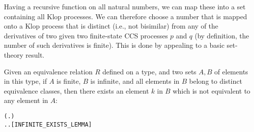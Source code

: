 Having
 a recursive function  on all natural numbers,
  we can map these into a set containing  all Klop processes. 
We can therefore 
choose a number that is mapped onto a Klop process
that is distinct (i.e., not bisimilar)  from 
any  of the derivatives of two  given 
two finite-state CCS processes $p$ and $q$
(by definition, the number of such derivatives is finite).
This is done by 
appealing to a basic set-theory result.

\begin{lemma}
Given an equivalence relation $R$ defined on a type, and two sets $A, B$
of elements in this type, 
if $A$ is finite, $B$ is infinite, and all elements
in $B$ belong to distinct equivalence classes, then there exists an element $k$ in $B$
which is not equivalent to any element in $A$:
\begin{alltt}
\HOLTokenTurnstile{}   \HOLSymConst{\HOLTokenImp{}}
     \HOLSymConst{\HOLTokenConj{}}   \HOLSymConst{\HOLTokenConj{}}
   (\HOLSymConst{\HOLTokenForall{}} .  \HOLSymConst{\HOLTokenIn{}}  \HOLSymConst{\HOLTokenConj{}}  \HOLSymConst{\HOLTokenIn{}}  \HOLSymConst{\HOLTokenConj{}}  \HOLSymConst{\HOLTokenNotEqual{}}  \HOLSymConst{\HOLTokenImp{}} \HOLSymConst{\HOLTokenNeg{}}  ) \HOLSymConst{\HOLTokenImp{}}
   \HOLSymConst{\HOLTokenExists{}}.  \HOLSymConst{\HOLTokenIn{}}  \HOLSymConst{\HOLTokenConj{}} \HOLSymConst{\HOLTokenForall{}}.  \HOLSymConst{\HOLTokenIn{}}  \HOLSymConst{\HOLTokenImp{}} \HOLSymConst{\HOLTokenNeg{}}  \hfill[INFINITE_EXISTS_LEMMA]
\end{alltt}
\end{lemma}

